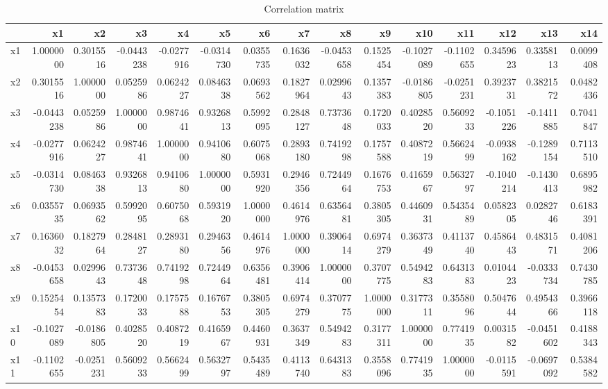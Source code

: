 \documentclass[
]{book}
\begin{document}
\begin{table}

\caption{\label{tab:unnamed-chunk-6}Correlation matrix}
\centering
\begin{tabular}[t]{lrrrrrrrrrrrrrr}
\toprule
  & x1 & x2 & x3 & x4 & x5 & x6 & x7 & x8 & x9 & x10 & x11 & x12 & x13 & x14\\
\midrule
x1 & 1.0000000 & 0.3015516 & -0.0443238 & -0.0277916 & -0.0314730 & 0.0355735 & 0.1636032 & -0.0453658 & 0.1525454 & -0.1027089 & -0.1102655 & 0.3459623 & 0.3358113 & 0.0099408\\
x2 & 0.3015516 & 1.0000000 & 0.0525986 & 0.0624227 & 0.0846338 & 0.0693562 & 0.1827964 & 0.0299643 & 0.1357383 & -0.0186805 & -0.0251231 & 0.3923731 & 0.3821572 & 0.0482436\\
x3 & -0.0443238 & 0.0525986 & 1.0000000 & 0.9874641 & 0.9326813 & 0.5992095 & 0.2848127 & 0.7373648 & 0.1720033 & 0.4028520 & 0.5609233 & -0.1051226 & -0.1411885 & 0.7041847\\
x4 & -0.0277916 & 0.0624227 & 0.9874641 & 1.0000000 & 0.9410680 & 0.6075068 & 0.2893180 & 0.7419298 & 0.1757588 & 0.4087219 & 0.5662499 & -0.0938162 & -0.1289154 & 0.7113510\\
x5 & -0.0314730 & 0.0846338 & 0.9326813 & 0.9410680 & 1.0000000 & 0.5931920 & 0.2946356 & 0.7244964 & 0.1676753 & 0.4165967 & 0.5632797 & -0.1040214 & -0.1430413 & 0.6895982\\
\addlinespace
x6 & 0.0355735 & 0.0693562 & 0.5992095 & 0.6075068 & 0.5931920 & 1.0000000 & 0.4614976 & 0.6356481 & 0.3805305 & 0.4460931 & 0.5435489 & 0.0582305 & 0.0282746 & 0.6183391\\
x7 & 0.1636032 & 0.1827964 & 0.2848127 & 0.2893180 & 0.2946356 & 0.4614976 & 1.0000000 & 0.3906414 & 0.6974279 & 0.3637349 & 0.4113740 & 0.4586443 & 0.4831571 & 0.4081206\\
x8 & -0.0453658 & 0.0299643 & 0.7373648 & 0.7419298 & 0.7244964 & 0.6356481 & 0.3906414 & 1.0000000 & 0.3707775 & 0.5494283 & 0.6431383 & 0.0104423 & -0.0333734 & 0.7430785\\
x9 & 0.1525454 & 0.1357383 & 0.1720033 & 0.1757588 & 0.1676753 & 0.3805305 & 0.6974279 & 0.3707775 & 1.0000000 & 0.3177311 & 0.3558096 & 0.5047644 & 0.4954366 & 0.3966118\\
x10 & -0.1027089 & -0.0186805 & 0.4028520 & 0.4087219 & 0.4165967 & 0.4460931 & 0.3637349 & 0.5494283 & 0.3177311 & 1.0000000 & 0.7741935 & 0.0031582 & -0.0451602 & 0.4188343\\
\addlinespace
x11 & -0.1102655 & -0.0251231 & 0.5609233 & 0.5662499 & 0.5632797 & 0.5435489 & 0.4113740 & 0.6431383 & 0.3558096 & 0.7741935 & 1.0000000 & -0.0115591 & -0.0697092 & 0.5384582\\

\end{tabular}
\end{table}
\end{document}
